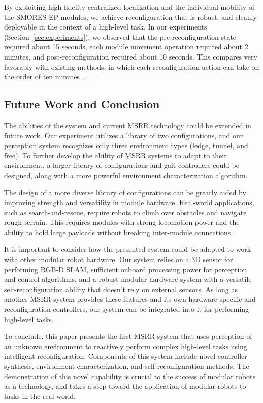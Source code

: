\documentclass[conference]{IEEEtran}
\newcommand{\TODO}[1]{ {\bf \textcolor{red}{TODO:} #1 }}
\begin{document}
By exploiting high-fidelity centralized localization and the individual mobility of the SMORES-EP modules, we achieve reconfiguration that is robust, and cleanly deployable in the context of a high-level task. In our experiments (Section~\ref{sec:experiments}), we observed that the pre-reconfiguration state required about 15 seconds, each module movement operation required about 2 minutes, and post-reconfiguration required about 10 seconds.
This compares very favorably with existing methods, in which each reconfiguration action can take on the order of ten minutes \cite{Yim2007},\cite{Murata2006},\cite{Rubenstein2004}.
%
\subsection{Future Work and Conclusion}
%
The abilities of the system and current MSRR technology could be extended in future work.  Our experiment utilizes a library of two configurations, and our perception system recognizes only three environment types (ledge, tunnel, and free).  To further develop the ability of MSRR systems to adapt to their environment, a larger library of configurations and gait controllers could be designed, along with a more powerful environment characterization algorithm.

The design of a more diverse library of configurations can be greatly aided by improving strength and versatility in module hardware. Real-world applications, such as search-and-rescue, require robots to climb over obstacles and navigate rough terrain. This requires modules with strong locomotion power and the ability to hold large payloads without breaking inter-module connections.

It is important to consider how the presented system could be adapted to work with other modular robot hardware. Our system relies on a 3D sensor for performing RGB-D SLAM, sufficient onboard processing power for perception and control algorithms, and a robust modular hardware system with a versatile self-reconfiguration ability that doesn't rely on external sensors. As long as another MSRR system provides these features and its own hardware-specific and reconfiguration controllers, our system can be integrated into it for performing high-level tasks.

To conclude, this paper presents the first MSRR system that uses perception of an unknown environment to reactively perform complex high-level tasks using intelligent reconfiguration. Components of this system include novel controller synthesis, environment characterization, and self-reconfiguration methods. The demonstration of this novel capability is crucial to the success of modular robots as a technology, and takes a step toward the application of modular robots to tasks in the real world.
%
%
\end{document}
